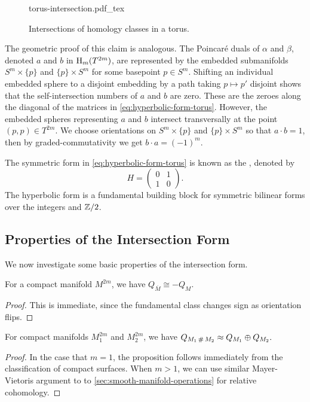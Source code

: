 \begin{figure}[ht]
	\centering
	{torus-intersection.pdf_tex}
	\caption{Intersections of homology classes in a torus.}\label{fig:geometric-intersection-torus}
\end{figure}

The geometric proof of this claim is analogous. The Poincar\'e duals of $\alpha$ and $\beta$, denoted $a$ and $b$ in $\operatorname{H}_{m}(T^{2m})$, are represented
by the embedded submanifolds $S^m\times \{p\}$ and $\{p\}\times S^m$ for some basepoint $p\in S^m$. Shifting an individual embedded sphere to a disjoint embedding by a path taking $p\mapsto p'$ disjoint shows that the self-intersection numbers of $a$ and $b$ are zero. These are the zeroes along the diagonal of the matrices in \cref{eq:hyperbolic-form-torus}. However, the embedded spheres representing $a$ and $b$ intersect transversally at the point $(p,p)\in T^{2m}$. We choose orientations on $S^m\times \{p\}$ and $\{p\}\times S^m$ so that $a\cdot b=1$, then by graded-commutativity we get $b\cdot a=(-1)^m$.

\begin{remark*}
	The symmetric form in \cref{eq:hyperbolic-form-torus} is known as the , denoted by
	\[
		H=\begin{pmatrix} 0 & 1\\ 1 & 0 \end{pmatrix}.
	\]
	The hyperbolic form is a fundamental building block for symmetric bilinear forms over the integers and $\mathbb{Z}/2$.
\end{remark*}

\subsection{Properties of the Intersection Form}
We now investigate some basic properties of the intersection form.

\begin{proposition}\label{prop:orientation-intersection-form}
	For a compact manifold $M^{2m}$, we have
	$Q_{\overline{M}} \cong -Q_{M}$.
\end{proposition}
\begin{proof}
	This is immediate, since the fundamental class changes sign as orientation flips.
\end{proof}

\begin{proposition}\label{prop:connected-sum-intersection-form}
	For compact manifolds $M_1^{2m}$ and $M_2^{2m}$, we have
	$Q_{M_1\+M_2} \cong Q_{M_1}\oplus Q_{M_2}.$
\end{proposition}
\begin{proof}
	In the case that $m=1$, the proposition follows immediately from the classification of compact surfaces. When $m>1$, we can use similar Mayer-Vietoris argument to
	to \cref{sec:smooth-manifold-operations} for relative cohomology.
\end{proof}

